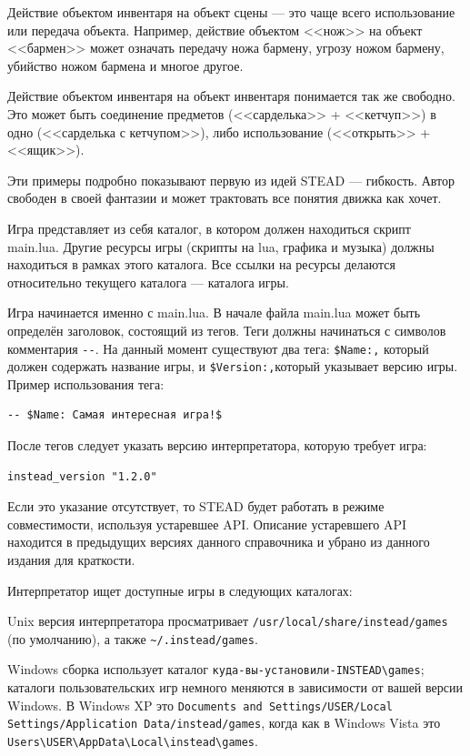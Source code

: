 \documentclass[a4paper,12pt]{article}
\begin{document}
Действие объектом инвентаря на объект сцены --- это чаще всего использование или передача объекта. Например, действие объектом <<нож>> на объект <<бармен>> может означать передачу ножа бармену, угрозу ножом бармену, убийство ножом бармена и многое другое.

Действие объектом инвентаря на объект инвентаря понимается так же свободно. Это может быть соединение предметов (<<сарделька>> + <<кетчуп>>) в одно (<<сарделька с кетчупом>>), либо использование (<<открыть>> + <<ящик>>).

Эти примеры подробно показывают первую из идей STEAD --- гибкость. Автор свободен в своей фантазии и может трактовать все понятия движка как хочет.

Игра представляет из себя каталог, в котором должен находиться скрипт main.lua. Другие ресурсы игры (скрипты на lua, графика и музыка) должны находиться в рамках этого каталога. Все ссылки на ресурсы делаются относительно текущего каталога --- каталога игры.

Игра начинается именно с main.lua. В начале файла main.lua может быть определён заголовок, состоящий из тегов. Теги должны начинаться с символов комментария \verb/--/. На данный момент существуют два тега: \verb/$Name:,/ который должен содержать название игры, и \verb/$Version:,/который указывает версию игры. Пример использования тега:

\begin{verbatim}
-- $Name: Самая интересная игра!$
\end{verbatim}

После тегов следует указать версию интерпретатора, которую требует игра:

\begin{verbatim}
instead_version "1.2.0"
\end{verbatim}

Если это указание отсутствует, то STEAD будет работать в режиме совместимости, используя устаревшее API. Описание устаревшего API находится в предыдущих версиях данного справочника и убрано из данного издания для краткости.

Интерпретатор ищет доступные игры в следующих каталогах:

Unix версия интерпретатора просматривает \verb;/usr/local/share/instead/games; (по умолчанию), а также \verb,~/.instead/games,.

Windows сборка использует каталог \verb/куда-вы-установили-INSTEAD\games/; каталоги пользовательских игр немного меняются в зависимости от вашей версии Windows. В Windows XP это \texttt{Documents and Settings/USER/Local Settings/Application Data/instead/games}, когда как в Windows Vista это \verb;Users\USER\AppData\Local\instead\games;.
\end{document}
